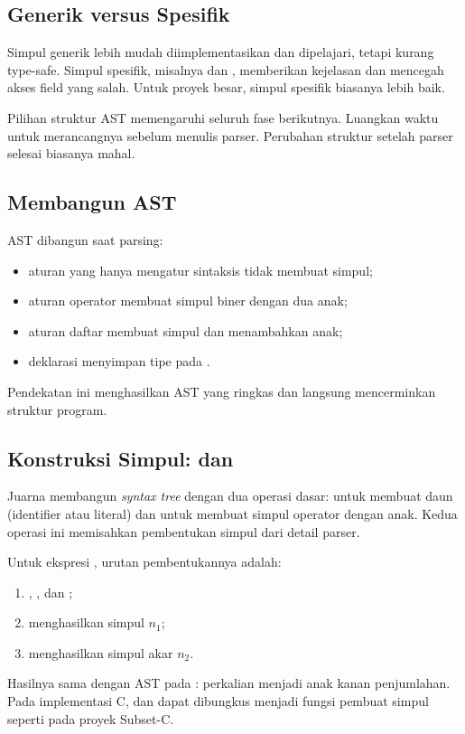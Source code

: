 
\subsection{Generik versus Spesifik}

Simpul generik lebih mudah diimplementasikan dan dipelajari, tetapi
kurang type-safe. Simpul spesifik, misalnya  dan
, memberikan kejelasan dan mencegah akses field yang
salah. Untuk proyek besar, simpul spesifik biasanya lebih baik.

\begin{infobox}
Pilihan struktur AST memengaruhi seluruh fase berikutnya. Luangkan
waktu untuk merancangnya sebelum menulis parser. Perubahan struktur
setelah parser selesai biasanya mahal.
\end{infobox}

\subsection{Membangun AST}

AST dibangun saat parsing:
\begin{itemize}[leftmargin=*]
  \item aturan yang hanya mengatur sintaksis tidak membuat simpul;
  \item aturan operator membuat simpul biner dengan dua anak;
  \item aturan daftar membuat simpul dan menambahkan anak;
  \item deklarasi menyimpan tipe pada .
\end{itemize}

Pendekatan ini menghasilkan AST yang ringkas dan langsung mencerminkan
struktur program.

\subsection{Konstruksi Simpul:  dan }

Juarna membangun \emph{syntax tree} dengan dua operasi dasar:
 untuk membuat daun (identifier atau literal) dan
 untuk membuat simpul operator dengan anak. Kedua operasi
ini memisahkan pembentukan simpul dari detail parser.

Untuk ekspresi , urutan pembentukannya adalah:
\begin{enumerate}[label=\arabic*.,leftmargin=*]
  \item {}, , dan
        ;
  \item {} menghasilkan simpul \(n_1\);
  \item {} menghasilkan simpul akar \(n_2\).
\end{enumerate}
Hasilnya sama dengan AST pada : perkalian menjadi
anak kanan penjumlahan. Pada implementasi C,  dan
 dapat dibungkus menjadi fungsi pembuat simpul seperti
 pada proyek Subset-C.

